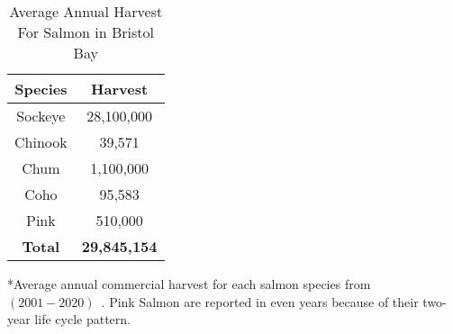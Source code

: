 \begin{table}[H]
    \centering
    \caption{Average Annual Harvest For Salmon in Bristol Bay}\label{tab:harvestBristol}
    \vspace{.25cm}
    \begin{tabular}{|c|c|}
    \hline
         \textbf{Species} & \textbf{Harvest} \\
         \hline
         Sockeye & 28,100,000\\
         Chinook & 39,571\\
         Chum & 1,100,000\\
         Coho & 95,583\\
         Pink & 510,000\\
         \hline
         \textbf{\color{black}Total} & \textbf{29,845,154}\\
         \hline
    \end{tabular}
    \vspace{1ex}
    
    {\singlespacing
    *Average annual commercial harvest for each salmon species from $(2001 - 2020)$~\cite{bristol}. Pink Salmon are reported in even years because of their two-year life cycle pattern.\par}
\end{table}